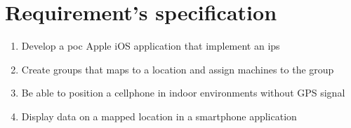 \chapter{Requirement's specification}\label{appendix:requirements}
\begin{enumerate}
	\item\label{req:developeApp}
	Develop a \acrlong{poc} Apple iOS application that implement an \acrlong{ips}

	\item\label{req:createGroups}
	Create groups that maps to a location and assign machines to the group 

	\item\label{req:positionDevice}
	Be able to position a cellphone in indoor environments without GPS signal 

	\item\label{req:displayData}
	Display data on a mapped location in a smartphone application
\end{enumerate}


